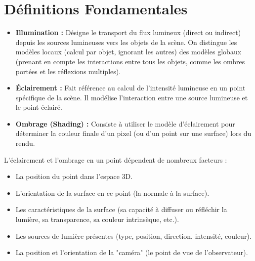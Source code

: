 \section{Définitions Fondamentales}
\begin{itemize}
    \item \textbf{Illumination :} Désigne le transport du flux lumineux (direct ou indirect) depuis les sources lumineuses vers les objets de la scène. On distingue les modèles locaux (calcul par objet, ignorant les autres) des modèles globaux (prenant en compte les interactions entre tous les objets, comme les ombres portées et les réflexions multiples).
    \item \textbf{Éclairement :} Fait référence au calcul de l'intensité lumineuse en un point spécifique de la scène. Il modélise l'interaction entre une source lumineuse et le point éclairé.
    \item \textbf{Ombrage (Shading) :} Consiste à utiliser le modèle d'éclairement pour déterminer la couleur finale d'un pixel (ou d'un point sur une surface) lors du rendu.
\end{itemize}
L'éclairement et l'ombrage en un point dépendent de nombreux facteurs :
\begin{itemize}
    \item La position du point dans l'espace 3D.
    \item L'orientation de la surface en ce point (la normale à la surface).
    \item Les caractéristiques de la surface (sa capacité à diffuser ou réfléchir la lumière, sa transparence, sa couleur intrinsèque, etc.).
    \item Les sources de lumière présentes (type, position, direction, intensité, couleur).
    \item La position et l'orientation de la "caméra" (le point de vue de l'observateur).
\end{itemize}

